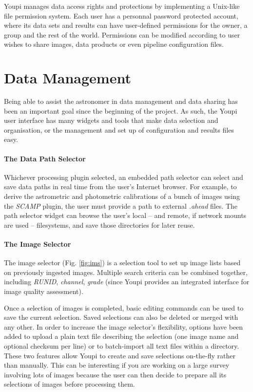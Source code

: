 \documentclass[11pt,twoside]{article}  %
\begin{document}
Youpi manages data access rights and protections by implementing a Unix-like file permission system. 
Each user has a personnal password protected account, where its data sets and results can have 
user-defined permissions for the owner, a group and the rest of the world. Permissions can be 
modified according to user wishes to share images, data products or even pipeline configuration 
files.

\section{Data Management}

Being able to assist the astronomer in data management and data sharing has been an important 
goal since the beginning of the project. As such, the Youpi user interface has many widgets 
and tools that make data selection and organisation, or the management and set up of configuration 
and results files easy.

\paragraph{The Data Path Selector}

Whichever processing plugin selected, an embedded path selector can select and save data paths 
in real time from the user's Internet browser. For example, to derive the astrometric and photometric 
calibrations of a bunch of images using the \emph{SCAMP} plugin, the user must provide a path to 
external \emph{.ahead} files. The path selector widget can browse the user's local -- and remote, 
if network mounts are used -- filesystems, and save those directories for later reuse.

\paragraph{The Image Selector}\label{sec:ims}

The image selector (Fig. \ref{fig:ims}) is a selection tool to set up image lists based on previously 
ingested images. Multiple search criteria can be combined together, including \emph{RUNID}, \emph{channel}, 
\emph{grade} (since Youpi provides an integrated interface for image quality assessment).

Once a selection of images is completed, basic editing commands can be used to save the current 
selection. Saved selections can also be deleted or merged with any other. In order to increase the 
image selector's flexibility, options have been added to upload a plain text file describing the 
selection (one image name and optional checksum per line) or to batch-import all text files within 
a directory. These two features allow Youpi to create and save selections on-the-fly rather than 
manually. This can be interesting if you are working on a large survey involving lots of images 
because the user can then decide to prepare all its selections of images before processing them.
\end{document}
